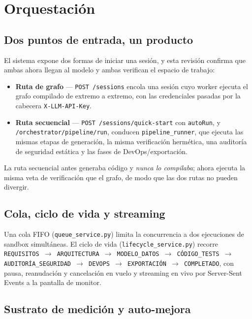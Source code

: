 \documentclass[11pt,a4paper]{article}
\begin{document}
\section{Orquestación}

\subsection{Dos puntos de entrada, un producto}

El sistema expone dos formas de iniciar una sesión, y esta revisión confirma que ambas
ahora llegan al modelo y ambas verifican el espacio de trabajo:

\begin{itemize}[leftmargin=1.4em]
  \item \textbf{Ruta de grafo} --- \texttt{POST /sessions} encola una sesión cuyo
  worker ejecuta el grafo compilado de extremo a extremo, con las credenciales pasadas
  por la cabecera \texttt{X-LLM-API-Key}.
  \item \textbf{Ruta secuencial} --- \texttt{POST /sessions/quick-start} con
  \texttt{autoRun}, y \texttt{/orchestrator/pipeline/run}, conducen
  \texttt{pipeline\_runner}, que ejecuta las mismas etapas de generación, la misma
  verificación hermética, una auditoría de seguridad estática y las fases de
  DevOps/exportación.
\end{itemize}

La ruta secuencial antes generaba código y \emph{nunca lo compilaba}; ahora ejecuta la
misma veta de verificación que el grafo, de modo que las dos rutas no pueden divergir.

\subsection{Cola, ciclo de vida y streaming}

Una cola FIFO (\texttt{queue\_service.py}) limita la concurrencia a dos ejecuciones de
sandbox simultáneas. El ciclo de vida (\texttt{lifecycle\_service.py}) recorre
\texttt{REQUISITOS $\rightarrow$ ARQUITECTURA $\rightarrow$ MODELO\_DATOS
$\rightarrow$ CÓDIGO\_TESTS $\rightarrow$ AUDITORÍA\_SEGURIDAD $\rightarrow$ DEVOPS
$\rightarrow$ EXPORTACIÓN $\rightarrow$ COMPLETADO}, con pausa, reanudación y
cancelación en vuelo y streaming en vivo por Server-Sent Events a la pantalla de
monitor.

\subsection{Sustrato de medición y auto-mejora}
\end{document}

